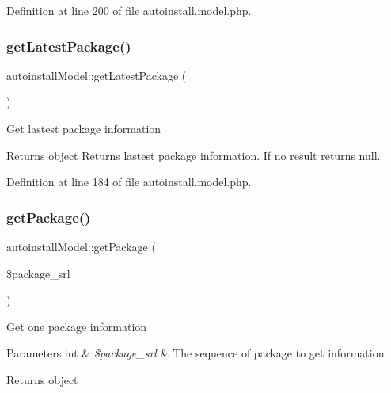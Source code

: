 Definition at line 200 of file autoinstall.\+model.\+php.

\hypertarget{classautoinstallModel_a237e95933e438cec978e9382dfee6199}{}\label{classautoinstallModel_a237e95933e438cec978e9382dfee6199} 
\subsubsection{\texorpdfstring{get\+Latest\+Package()}{getLatestPackage()}}
{\footnotesize\ttfamily autoinstall\+Model\+::get\+Latest\+Package (\begin{DoxyParamCaption}{ }\end{DoxyParamCaption})}

Get lastest package information

\begin{DoxyReturn}{Returns}
object Returns lastest package information. If no result returns null. 
\end{DoxyReturn}


Definition at line 184 of file autoinstall.\+model.\+php.

\hypertarget{classautoinstallModel_aaa22f977e7ba5720afda446a6e508c51}{}\label{classautoinstallModel_aaa22f977e7ba5720afda446a6e508c51} 
\subsubsection{\texorpdfstring{get\+Package()}{getPackage()}}
{\footnotesize\ttfamily autoinstall\+Model\+::get\+Package (\begin{DoxyParamCaption}\item[{}]{\$package\+\_\+srl }\end{DoxyParamCaption})}

Get one package information


\begin{DoxyParams}[1]{Parameters}
int & {\em \$package\+\_\+srl} & The sequence of package to get information \\
\hline
\end{DoxyParams}
\begin{DoxyReturn}{Returns}
object 
\end{DoxyReturn}


